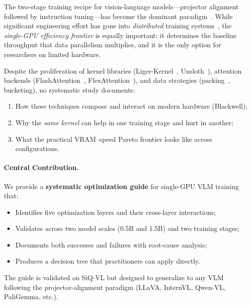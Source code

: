 \documentclass[11pt,a4paper]{article}
\begin{document}
The two-stage training recipe for vision-language models---projector alignment followed by
instruction tuning---has become the dominant paradigm~\cite{liu2023llava,liu2024llava15}.
While significant engineering effort has gone into \emph{distributed} training
systems~\cite{shoeybi2019megatron,rasley2020deepspeed}, the \emph{single-GPU efficiency
frontier} is equally important: it determines the baseline throughput that data parallelism
multiplies, and it is the only option for researchers on limited hardware.

Despite the proliferation of kernel libraries (Liger-Kernel~\cite{hsu2024liger},
Unsloth~\cite{unsloth2024}), attention backends (FlashAttention~\cite{dao2022flashattention,dao2023flashattention2},
FlexAttention~\cite{he2024flexattention}), and data strategies (packing~\cite{krell2021efficient},
bucketing), no systematic study documents:
\begin{enumerate}[leftmargin=*,nosep]
  \item How these techniques compose and interact on modern hardware (Blackwell);
  \item Why the \emph{same kernel} can help in one training stage and hurt in another;
  \item What the practical VRAM--speed Pareto frontier looks like across configurations.
\end{enumerate}

\paragraph{Central Contribution.}
We provide a \textbf{systematic optimization guide} for single-GPU VLM training that:
\begin{itemize}[leftmargin=*,nosep]
  \item Identifies five optimization layers and their cross-layer interactions;
  \item Validates across two model scales (0.5B and 1.5B) and two training stages;
  \item Documents both successes and failures with root-cause analysis;
  \item Produces a decision tree that practitioners can apply directly.
\end{itemize}

The guide is validated on SiQ-VL but designed to generalize to any VLM following the
projector-alignment paradigm (LLaVA, InternVL, Qwen-VL, PaliGemma, etc.).
\end{document}
